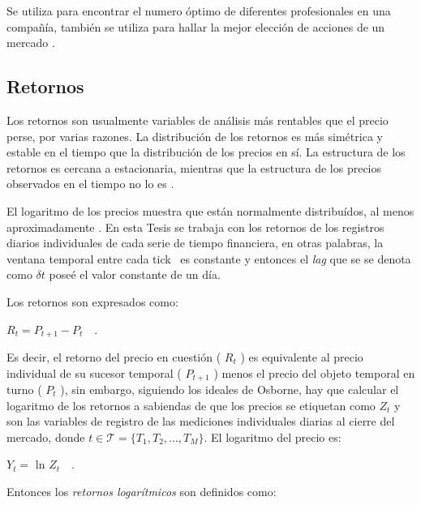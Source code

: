 Se utiliza para encontrar el numero óptimo de diferentes profesionales en una compañía, también se utiliza para hallar la mejor elección de acciones de un mercado \citep[][]{richmond}. 


\subsection{Retornos} 
Los retornos son usualmente variables de análisis más rentables que el precio perse, por varias razones. 
La distribución de los retornos es más simétrica y estable en el tiempo que la distribución de los precios en sí. 
La estructura de los retornos es cercana a estacionaria, mientras que la estructura de los precios observados en el tiempo no lo es \citep[][pagina 17]{dacoragna}.

El logaritmo de los precios muestra que están normalmente distribuídos, al menos aproximadamente \citep[][]{osborne}. En esta Tesis se trabaja con los retornos de los registros diarios individuales de cada serie de tiempo financiera, en otras palabras, la ventana temporal entre cada \guillemotleft tick\guillemotright~ es constante y entonces el \textit{lag} que se se denota como $\delta t$ poseé el valor constante de un día. 


Los retornos son expresados como:
\begin{center}
$R_t=P_{t+1}-P_t$~~.
\end{center}
Es decir, el retorno del precio en cuestión ( $R_t$ ) es equivalente al precio individual de su sucesor temporal ( $P_{t+1}$ ) menos el precio del objeto temporal en turno ( $P_t$ ), sin embargo, siguiendo los ideales de Osborne, hay que calcular el logaritmo de los retornos a sabiendas de que los precios se etiquetan como $\mathit{Z_t}$ y son las variables de registro de las mediciones individuales diarias al cierre del mercado, donde \newline $t \in \mathcal{T} = \{\mathit{T_1,T_2,\ldots , T_M}\}$. El logaritmo del precio es:

\begin{center}
$\mathit{Y_{t}} = $ ln $\mathit{Z_{t}}$~~.
\end{center}

Entonces los \textit{retornos logarítmicos} son definidos como: 

